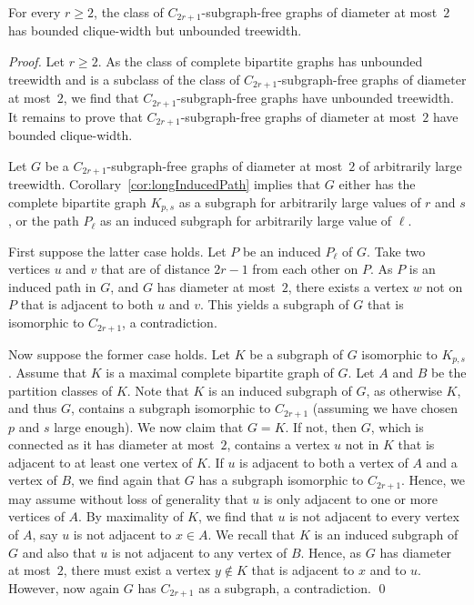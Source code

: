 \documentclass[runningheads,envcountsame]{llncs}
\begin{document}
\begin{theorem}\label{t-cwtw}
For every $r\geq 2$, the class of $C_{2r+1}$-subgraph-free graphs of diameter at most~$2$ has bounded clique-width but unbounded treewidth.
\end{theorem}

\begin{proof}
Let $r\geq 2$. As the class of complete bipartite graphs has unbounded treewidth and is a subclass of the class of $C_{2r+1}$-subgraph-free graphs of diameter at most~$2$, we find that $C_{2r+1}$-subgraph-free graphs have unbounded treewidth. It remains to prove that $C_{2r+1}$-subgraph-free graphs of diameter at most~$2$ have bounded clique-width.

Let $G$ be a $C_{2r+1}$-subgraph-free graphs of diameter at most~$2$ of arbitrarily large treewidth. Corollary~\ref{cor:longInducedPath} implies that $G$ either has the complete bipartite graph $K_{p,s}$ as a subgraph for arbitrarily large values of $r$ and $s$, or the path $P_\ell$ as an induced subgraph for arbitrarily large value of $\ell$. 

First suppose the latter case holds. Let $P$ be an induced $P_\ell$ of $G$. Take two vertices $u$ and $v$  that are of distance $2r-1$ from each other on $P$. As $P$ is an induced path in $G$, and $G$ has diameter at most~$2$, there exists a vertex $w$ not on $P$ that is adjacent to both $u$ and $v$. This yields a subgraph of $G$ that is isomorphic to $C_{2r+1}$, a contradiction.

Now suppose the former case holds. Let $K$ be a subgraph of $G$ isomorphic to $K_{p,s}$. Assume that $K$ is a maximal complete bipartite graph of $G$. Let $A$ and $B$ be the partition classes of $K$. Note that $K$ is an induced subgraph of $G$, as otherwise $K$, and thus $G$, contains a subgraph isomorphic to $C_{2r+1}$ (assuming we have chosen $p$ and $s$ large enough). We now claim that $G=K$. If not, then $G$, which is connected as it has diameter at most~$2$, contains a vertex $u$ not in $K$ that is adjacent to at least one vertex of $K$. If $u$ is adjacent to both a vertex of $A$ and a vertex of $B$, we find again that $G$ has a subgraph isomorphic to $C_{2r+1}$. Hence, we may assume without loss of generality that $u$ is only adjacent to one or more vertices of $A$. By maximality of $K$, we find that $u$ is not adjacent to every vertex of $A$, say $u$ is not adjacent to $x\in A$. We recall  that $K$ is an induced subgraph of $G$ and also that $u$ is not adjacent to any vertex of $B$. Hence, as $G$ has diameter at most~$2$, there must exist a vertex $y\notin K$ that is adjacent to $x$ and to $u$. However, now again $G$ has $C_{2r+1}$ as a subgraph, a contradiction.
\qed
\end{proof}
\end{document}
